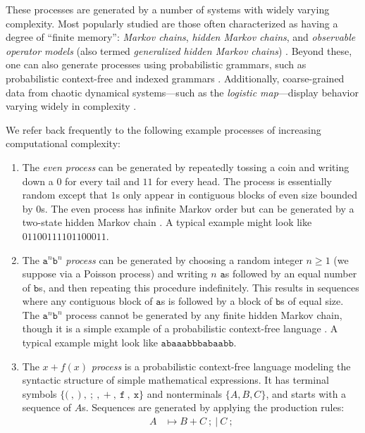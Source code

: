 \documentclass[draft,aps,pre,twocolumn,groupaddress,showkeys,nofootinbib,preprintnumbers,floatfix]{revtex4-2}
\begin{document}
These processes are generated by a number of systems with widely varying
complexity. Most popularly studied are those often characterized as having a
degree of ``finite memory'': \emph{Markov chains}, \emph{hidden Markov chains},
and \emph{observable operator models} (also termed \emph{generalized hidden
Markov chains}) \cite{Uppe97a,Jaeg00a}. Beyond these, one can also generate
processes using probabilistic grammars, such as probabilistic context-free and
indexed grammars \cite{Gema00a}. Additionally, coarse-grained data from chaotic
dynamical systems---such as the \emph{logistic map}---display behavior varying
widely in complexity \cite{Crut92c}.

We refer back frequently to the following example processes of increasing
computational complexity:
\begin{enumerate}
      \setlength{\topsep}{-2pt}
      \setlength{\itemsep}{-2pt}
      \setlength{\parsep}{-2pt}
\item The \emph{even process} can be generated by repeatedly tossing a coin
	and writing down a $0$ for every tail and $11$ for every head. The process
	is essentially random except that $1$s only appear in contiguous blocks of
	even size bounded by $0$s. The even process has infinite Markov order but
	can be generated by a two-state hidden Markov chain \cite{Crut01a}. A
	typical example might look like $01100111101100011$.
\item The $\mathtt{a}^n \mathtt{b}^n$ \emph{process} can be generated by
	choosing a random integer $n\geq 1$ (we suppose via a Poisson process) and
	writing $n$ $\mathtt{a}$s followed by an equal number of $\mathtt{b}$s,
	and then repeating this procedure indefinitely. This results in sequences
	where any contiguous block of $\mathtt{a}$s is followed by a block of
	$\mathtt{b}$s of equal size. The $\mathtt{a}^n \mathtt{b}^n$ process cannot
	be generated by any finite hidden Markov chain, though it is a simple
	example of a probabilistic context-free language \cite{Hopc06a}. A typical
	example might look like $\mathtt{abaaabbbabaabb}$.
\item The $x+f(x)$ \emph{process} is a probabilistic context-free language
	modeling the syntactic structure of simple mathematical expressions. It has
	terminal symbols $\{\mathtt{(}\ ,\ \mathtt{)}\ ,\ \mathtt{;}\ ,\
	\mathtt{+}\ ,\ \mathtt{f}\ ,\ \mathtt{x}\}$ and nonterminals $\{A,B,C\}$,
	and starts with a sequence of $A$s. Sequences are generated by applying the
	production rules:
\begin{align*}
    A &\mapsto B\ \mathtt{+}\ C\ \mathtt{;}\ |\ C\ \mathtt{;}\\

\end{align*}
\end{enumerate}
\end{document}
